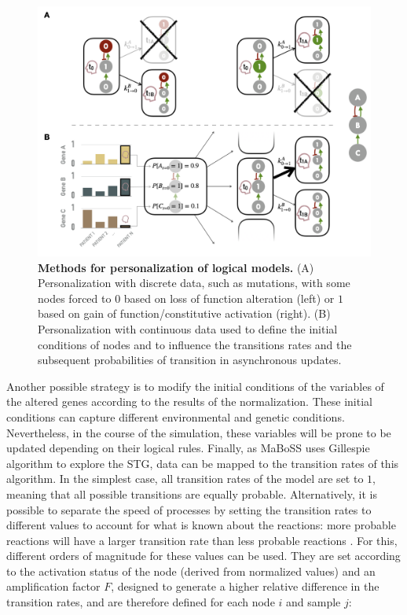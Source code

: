 \documentclass[a4paper,12pt,twoside,onecolumn,openright,final,oldfontcommands]{memoir}
\begin{document}
\begin{figure}

{\centering \includegraphics[width=0.9\linewidth]{fig/logical-personalization} 

}

\caption[Methods for personalization of logical models]{\textbf{Methods for
personalization of logical models.} (A) Personalization with discrete
data, such as mutations, with some nodes forced to \(0\) based on loss
of function alteration (left) or \(1\) based on gain of
function/constitutive activation (right). (B) Personalization with
continuous data used to define the initial conditions of nodes and to
influence the transitions rates and the subsequent probabilities of
transition in asynchronous updates.}\label{fig:logical-personalization}
\end{figure}










Another possible strategy is to modify the initial conditions of the
variables of the altered genes according to the results of the
normalization. These initial conditions can capture different
environmental and genetic conditions. Nevertheless, in the course of the
simulation, these variables will be prone to be updated depending on
their logical rules. Finally, as MaBoSS uses Gillespie algorithm to
explore the STG, data can be mapped to the transition rates of this
algorithm. In the simplest case, all transition rates of the model are
set to \(1\), meaning that all possible transitions are equally
probable. Alternatively, it is possible to separate the speed of
processes by setting the transition rates to different values to account
for what is known about the reactions: more probable reactions will have
a larger transition rate than less probable reactions
\citep{stoll2012continuous}. For this, different orders of magnitude for
these values can be used. They are set according to the activation
status of the node (derived from normalized values) and an amplification
factor \(F\), designed to generate a higher relative difference in the
transition rates, and are therefore defined for each node \(i\) and
sample \(j\):
\end{document}
